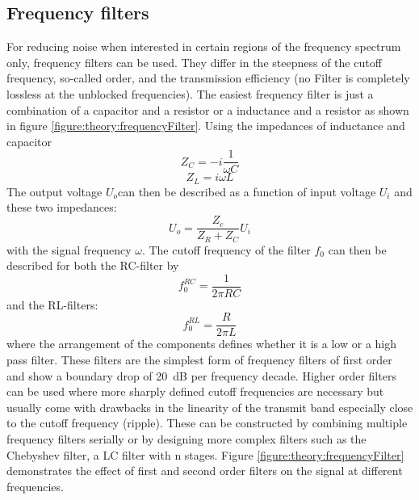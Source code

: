             \subsection{Frequency filters}
            For reducing noise when interested in certain regions of the frequency spectrum only, frequency filters can be used. They differ in the steepness of the cutoff frequency, so-called order, and the transmission efficiency (no Filter is completely lossless at the unblocked frequencies). The easiest frequency filter is just a combination of a capacitor and a resistor or a inductance and a resistor as shown in figure \ref{figure:theory:frequencyFilter}. Using the impedances of inductance and capacitor
                \begin{equation*}
                    Z_C = -i\frac{1}{\omega C}
                \end{equation*}
                \begin{equation*}
                    Z_L = {i\omega L}
                \end{equation*} 
                The output voltage $U_o$can then be described as a function of input voltage $U_{i}$ and these two impedances:
                \begin{equation}
                    U_o = \frac{Z_c}{Z_R + Z_C} U_i
                \end{equation}
                with the signal frequency $\omega$. The cutoff frequency of the filter $f_0$ can then be described for both the RC-filter by
                \begin{equation}
                    f_0^{RC} = \frac{1}{2\pi R C}
                \end{equation}
                and the RL-filters:
                \begin{equation}
                    f_0^{RL} = \frac{R}{2\pi L}
                \end{equation}
                where the arrangement of the components defines whether it is a low or a high pass filter. These filters are the simplest form of frequency filters of first order and show a boundary drop of \SI{20}{\deci\bel} per frequency decade. Higher order filters can be used where more sharply defined cutoff frequencies are necessary but usually come with drawbacks in the linearity of the transmit band especially close to the cutoff frequency (ripple). These can be constructed by combining multiple frequency filters serially or by designing more complex filters such as the Chebyshev filter, a LC filter with n stages. Figure \ref{figure:theory:frequencyFilter} demonstrates the effect of first and second order filters on the signal at different frequencies.
